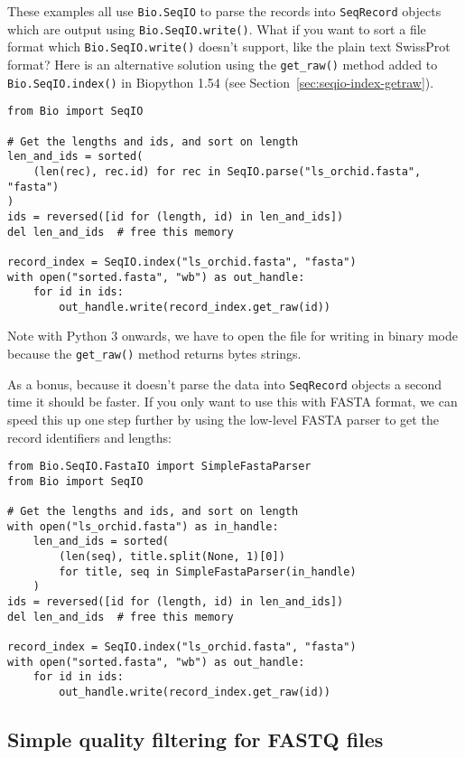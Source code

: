 These examples all use \verb|Bio.SeqIO| to parse the records into
\verb|SeqRecord| objects which are output using \verb|Bio.SeqIO.write()|.
What if you want to sort a file format which \verb|Bio.SeqIO.write()| doesn't
support, like the plain text SwissProt format? Here is an alternative
solution using the \verb|get_raw()| method added to \verb|Bio.SeqIO.index()|
in Biopython 1.54 (see Section~\ref{sec:seqio-index-getraw}).

\begin{verbatim}
from Bio import SeqIO

# Get the lengths and ids, and sort on length
len_and_ids = sorted(
    (len(rec), rec.id) for rec in SeqIO.parse("ls_orchid.fasta", "fasta")
)
ids = reversed([id for (length, id) in len_and_ids])
del len_and_ids  # free this memory

record_index = SeqIO.index("ls_orchid.fasta", "fasta")
with open("sorted.fasta", "wb") as out_handle:
    for id in ids:
        out_handle.write(record_index.get_raw(id))
\end{verbatim}

Note with Python 3 onwards, we have to open the file for writing in
binary mode because the \verb|get_raw()| method returns bytes strings.

As a bonus, because it doesn't parse the data into \verb|SeqRecord| objects
a second time it should be faster. If you only want to use this with FASTA
format, we can speed this up one step further by using the low-level FASTA
parser to get the record identifiers and lengths:

\begin{verbatim}
from Bio.SeqIO.FastaIO import SimpleFastaParser
from Bio import SeqIO

# Get the lengths and ids, and sort on length
with open("ls_orchid.fasta") as in_handle:
    len_and_ids = sorted(
        (len(seq), title.split(None, 1)[0])
        for title, seq in SimpleFastaParser(in_handle)
    )
ids = reversed([id for (length, id) in len_and_ids])
del len_and_ids  # free this memory

record_index = SeqIO.index("ls_orchid.fasta", "fasta")
with open("sorted.fasta", "wb") as out_handle:
    for id in ids:
        out_handle.write(record_index.get_raw(id))
\end{verbatim}

\subsection{Simple quality filtering for FASTQ files}
\label{sec:FASTQ-filtering-example}


